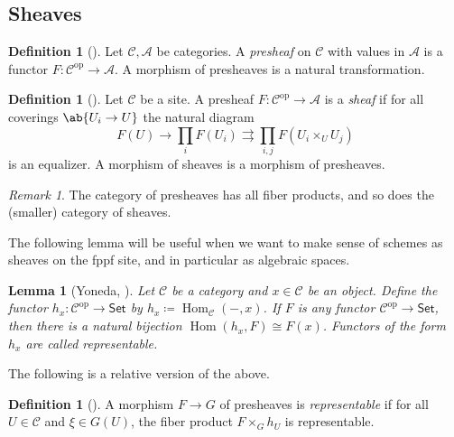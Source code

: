 \documentclass{amsart}
\newtheorem{lem}[thm]{Lemma}
\theoremstyle{definition}
\newtheorem{defn}[thm]{Definition}
\theoremstyle{remark}
\newtheorem{rmk}[thm]{Remark}
\theoremstyle{plain}
\theoremstyle{definition}
\theoremstyle{remark}
\newcommand{\mc}[1]{\mathcal{#1}}
\newcommand{\mr}[1]{\mathrm{#1}}
\newcommand{\ms}[1]{\mathsf{#1}}
\newcommand{\1}{\mathbf{1}}
\newcommand{\2}{\mathbf{2}}
\newcommand{\3}{\mathbf{3}}
\newcommand{\opp}{\mr{op}}
\DeclareMathOperator{\Hom}{Hom}
\begin{document}
\subsection{Sheaves}%

\begin{defn}[{\cite[\href{https://stacks.math.columbia.edu/tag/00V3}{Tag 00V3}]{stacks}}]
    Let $\mc{C}, \mc{A}$ be categories. A \textit{presheaf} on $\mc{C}$ with values in $\mc{A}$ is a functor $F \colon \mc{C}^{\opp} \to \mc{A}$. A morphism of presheaves is a natural transformation.
\end{defn}

\begin{defn}[{\cite[Definition 1.3.1]{fganotes}}]
    Let $\mc{C}$ be a site. A presheaf $F \colon \mc{C}^{\opp} \to \mc{A}$ is a \textit{sheaf} if for all coverings $\ab\{U_i \to U\}$ the natural diagram
    \[ F(U) \to \prod_i F (U_i) \rightrightarrows \prod_{i,j} F(U_i \times_U U_j) \]
    is an equalizer. A morphism of sheaves is a morphism of presheaves.
\end{defn}

\begin{rmk}
    The category of presheaves has all fiber products, and so does the (smaller) category of sheaves.
\end{rmk}



The following lemma will be useful when we want to make sense of schemes as sheaves on the fppf site, and in particular as algebraic spaces.

\begin{lem}[Yoneda, {\cite[Lemma 1.1.2]{fganotes}}]
    Let $\mc{C}$ be a category and $x \in \mc{C}$ be an object. Define the functor $h_x \colon \mc{C}^{\opp} \to \ms{Set}$ by $h_x \coloneqq \Hom_{\mc{C}}(-,x)$. If $F$ is any functor $\mc{C}^{\opp} \to \ms{Set}$, then there is a natural bijection $\Hom(h_x, F) \cong F(x)$. Functors of the form $h_x$ are called \textit{representable}.
\end{lem}

The following is a relative version of the above.

\begin{defn}[{\cite[\href{https://stacks.math.columbia.edu/tag/0023}{Tag 0023}]{stacks}}]
    A morphism $F \to G$ of presheaves is \textit{representable} if for all $U \in \mc{C}$ and $\xi \in G(U)$, the fiber product $F \times_G h_U$ is representable.
\end{defn}
\end{document}

